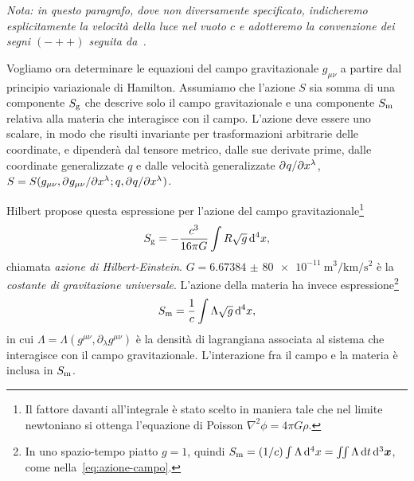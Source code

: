 \emph{Nota: in questo paragrafo, dove non diversamente specificato, indicheremo
  esplicitamente la velocità della luce nel vuoto $c$ e adotteremo la
  convenzione dei segni $(-++)$ seguita
  da~\textcites{barone:relativita,landau:campi}.}

Vogliamo ora determinare le equazioni del campo gravitazionale $g_{\mu\nu}$ a
partire dal principio variazionale di Hamilton.  Assumiamo che l'azione $S$ sia
somma di una componente $S_{\textup{g}}$ che descrive solo il campo
gravitazionale e una componente $S_{\textup{m}}$ relativa alla materia che
interagisce con il campo.  L'azione deve essere uno scalare, in modo che risulti
invariante per trasformazioni arbitrarie delle coordinate, e dipenderà dal
tensore metrico, dalle sue derivate prime, dalle coordinate generalizzate $q$ e
dalle velocità generalizzate $\partial^{} q / \partial {x^{\lambda}}^{}$, $S = S(g_{\mu\nu},
\partial^{} g_{\mu\nu} / \partial {x^{\lambda}}^{}; q, \partial^{} q / \partial {x^{\lambda}}^{})$.

Hilbert propose questa espressione per l'azione del campo
gravitazionale\footnote{Il fattore davanti all'integrale è stato scelto in
  maniera tale che nel limite newtoniano si ottenga l'equazione di Poisson
  $\nabla^{2} \phi = 4\pi G\rho$.}
\begin{equation}
  S_{\textup{g}} = -\frac{c^{3}}{16\pi G} \int R \sqrt{g} \mathop{}\!\mathrm{d}^{4} x,
\end{equation}
chiamata  \emph{azione di Hilbert-Einstein}.
$G = \SI{6.673 84(80)e-11}{\cubic\metre\per\kilo\metre\per\second\squared}$ è la
\emph{costante di gravitazione universale}.  L'azione della materia ha invece
espressione\footnote{In uno spazio-tempo piatto $g = 1$, quindi
  $S_{\textup{m}} = (1/c)\int \Lambda \mathop{}\!\mathrm{d}^{4} x = \iint \Lambda \mathop{}\!\mathrm{d} t\mathop{}\!\mathrm{d}^{3}
  \bm{x}$, come nella~\eqref{eq:azione-campo}.}
\begin{equation}
  S_{\textup{m}} = \frac{1}{c} \int \Lambda \sqrt{g} \mathop{}\!\mathrm{d}^{4} x,
\end{equation}
in cui $\Lambda = \Lambda(g^{\mu\nu}, \partial_{\lambda}g^{\mu\nu})$ è la densità
di lagrangiana associata al sistema che interagisce con il campo
gravitazionale.  L'interazione fra il campo e la materia è inclusa in
$S_{\textup{m}}$.

